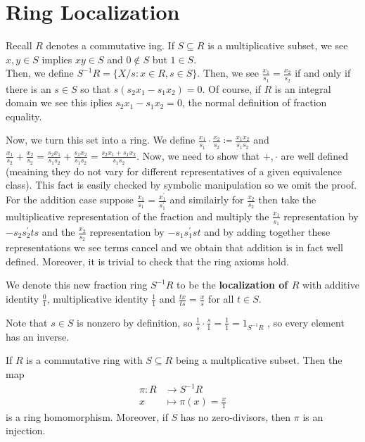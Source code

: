 \section{Ring Localization}
\begin{recall}
	Recall \(R\) denotes a commutative ing. If \(S \subseteq R\) is a multiplicative subset, we see \(x, y \in S\) implies \(xy\in S\) and \(0 \not\in S\) but \(1 \in S\).\\
	Then, we define \(S^{-1} R = \{X / s : x\in R, s \in S\} \). Then, we see \(\frac{x_1}{s_1} = \frac{x_2}{s_2}\) if and only if there is an \(s \in S\) so that \(s\left( s_2 x_1 - s_1 x_2 \right) = 0\). Of course, if \(R\) is an integral domain we see this iplies \(s_2 x_1 - s_1 x_2 = 0\), the normal definition of fraction equality.
\end{recall}
Now, we turn this set into a ring. We define \(\frac{x_1}{s_1}\cdot \frac{x_2}{s_2} \coloneqq \frac{x_1x_2}{s_1s_2}\) and \(\frac{x_1}{s_2} + \frac{x_2}{s_2} = \frac{s_2x_1}{s_1s_2} + \frac{s_1 x_2}{s_1 s_2} = \frac{s_2x_1 + s_1x_2}{s_1 s_2}\). Now, we need to show that \(+, \cdot\) are well defined (meaining they do not vary for different representatives of a given equivalence class). This fact is easily checked by symbolic manipulation so we omit the proof. For the addition case suppose \(\frac{x_1}{s_1} = \frac{x_1^{\prime}}{s_1^{\prime}}\) and similairly for \(\frac{x_2}{s_2}\) then take the multiplicative representation of the fraction and multiply the \(\frac{x_1}{s_1}\) representation by \(-s_2 s_2^{\prime} t s\) and the \(\frac{x_2}{s_2}\) representation by \(-s_1 s_1^{\prime} s t\) and by adding together these representations we see terms cancel and we obtain that addition is in fact well defined. Moreover, it is trivial to check that the ring axioms hold.
\begin{definition}
We denote this new fraction ring \(S^{-1} R\) to be the \textbf{localization of \(R\) } with additive identity \(\frac{0}{1}\), multiplicative identity \(\frac{1}{1}\) and \(\frac{tx}{ts}= \frac{x}{s}\) for all \(t \in S\).
\end{definition}
Note that \(s \in S\) is nonzero by definition, so \(\frac{1}{s} \cdot \frac{s}{1} = \frac{1}{1} = 1_{S^{-1} R}\) , so every element has an inverse.
\begin{proposition}
	If \(R\) is a commutative ring with \(S \subseteq R\) being a multplicative subset. Then the map \begin{align*}
		\pi: R &\longrightarrow S^{-1}R \\
		x &\longmapsto \pi(x) = \frac{x}{1}
	\end{align*} is a ring homomorphism. Moreover, if \(S\) has no zero-divisors, then \(\pi\) is an injection.
\end{proposition}
